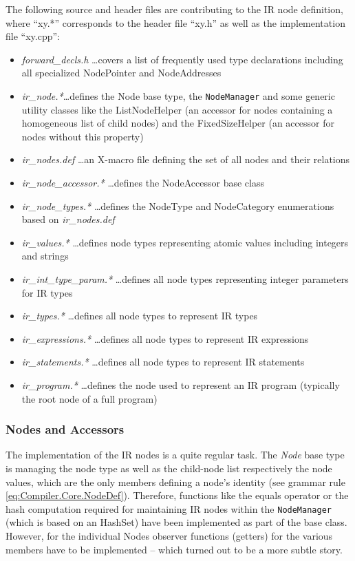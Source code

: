 The following source and header files are contributing to the IR node
definition, where ``xy.*'' corresponds to the header file ``xy.h'' as well as the
implementation file ``xy.cpp'':

\begin{itemize}
  \item \textit{forward\_decls.h} \ldots covers a list of frequently used type
  declarations including all specialized NodePointer and NodeAddresses
  \item \textit{ir\_node.*}\ldots defines the Node base type, the \texttt{NodeManager}
  and some generic utility classes like the ListNodeHelper (an accessor for
  nodes containing a homogeneous list of child nodes) and the FixedSizeHelper
  (an accessor for nodes without this property)
  \item \textit{ir\_nodes.def} \ldots an X-macro file defining the set of all
  nodes and their relations
  \item \textit{ir\_node\_accessor.*} \dots defines the NodeAccessor base class
  \item \textit{ir\_node\_types.*} \ldots defines the NodeType and NodeCategory
  enumerations based on \textit{ir\_nodes.def}
  \item \textit{ir\_values.*} \dots defines node types representing atomic
  values including integers and strings
  \item \textit{ir\_int\_type\_param.*} \ldots defines all node types
  representing integer parameters for IR types
  \item \textit{ir\_types.*} \ldots defines all node types to represent IR types
  \item \textit{ir\_expressions.*} \ldots defines all node types to represent IR
  expressions
  \item \textit{ir\_statements.*} \ldots defines all node types to represent IR
  statements
  \item \textit{ir\_program.*} \ldots defines the node used to represent an IR
  program (typically the root node of a full program)
\end{itemize}


\subsubsection{Nodes and Accessors} 
The implementation of the IR nodes is a quite regular task. The \textit{Node}
base type is managing the node type as well as the child-node list respectively
the node values, which are the only members defining a node's identity (see
grammar rule \ref{eq:Compiler.Core.NodeDef}). Therefore, functions like the
equals operator or the hash computation required for maintaining IR nodes
within the \texttt{NodeManager} (which is based on an HashSet) have been implemented
as part of the base class. However, for the individual Nodes observer functions
(getters) for the various members have to be implemented -- which turned out to
be a more subtle story.

